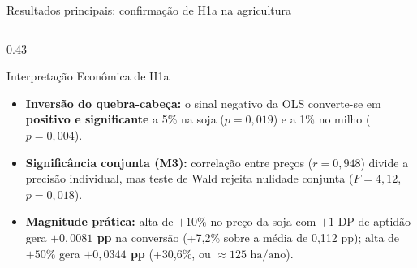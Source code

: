 \documentclass[aspectratio=169,10.5pt]{beamer}
\newcommand{\fonte}[1]{\par\vspace{1mm}{\fontsize{6.5}{7.5}\selectfont\color{gray}Fonte: #1\par}}
\begin{document}
\begin{frame}{Resultados principais: confirmação de H1a na agricultura}
\begin{columns}[T]
\begin{column}{0.43\textwidth}
\begin{block}{Interpretação Econômica de H1a}
\fontsize{7.5}{9}\selectfont
\begin{itemize}
    \setlength{\itemsep}{0.8mm}
    \item \textbf{Inversão do quebra-cabeça:} o sinal negativo da OLS converte-se em \textbf{positivo e significante} a 5\% na soja ($p=0{,}019$) e a 1\% no milho ($p=0{,}004$).
    \item \textbf{Significância conjunta (M3):} correlação entre preços ($r=0{,}948$) divide a precisão individual, mas teste de Wald rejeita nulidade conjunta ($F=4{,}12$, $p=0{,}018$).
    \item \textbf{Magnitude prática:} alta de $+10\%$ no preço da soja com $+1$ DP de aptidão gera \textbf{$+0{,}0081$ pp} na conversão (+7,2\% sobre a média de 0,112 pp); alta de $+50\%$ gera \textbf{$+0{,}0344$ pp} (+30,6\%, ou $\approx 125\text{ ha/ano}$).
\end{itemize}
\end{block}
\end{column}
\end{columns}
\end{frame}
\end{document}
